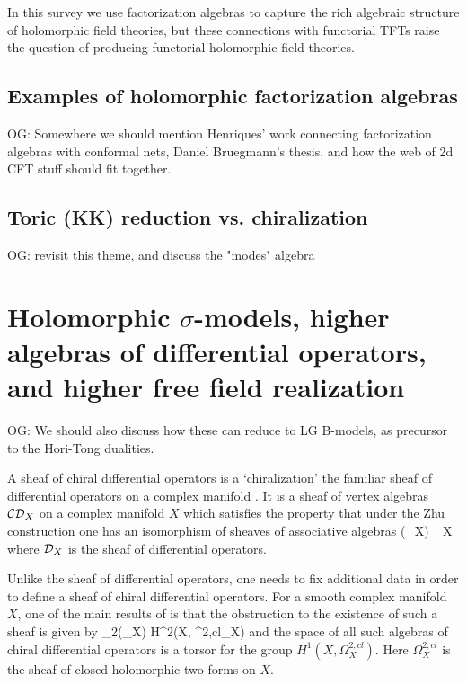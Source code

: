 \documentclass[11pt]{amsart}
\def\CDO{{\cC\cD}}
\def\owen#1{{\textcolor{violet!65!black}{OG: {#1}}}}
\begin{document}
In this survey we use factorization algebras to capture the rich algebraic structure of holomorphic field theories,
but these connections with functorial TFTs raise the question of producing functorial holomorphic field theories.

\subsection{Examples of holomorphic factorization algebras}

\owen{Somewhere we should mention Henriques' work connecting factorization algebras with conformal nets,
Daniel Bruegmann's thesis, and how the web of 2d CFT stuff should fit together.}


\subsection{Toric (KK) reduction vs. chiralization}

\owen{revisit this theme, and discuss the "modes" algebra}

\section{Holomorphic $\sigma$-models, higher algebras of differential operators, and higher free field realization}

\owen{We should also discuss how these can reduce to LG B-models, as precursor to the Hori-Tong dualities.}

A sheaf of chiral differential operators is a `chiralization' the familiar sheaf of differential operators on a complex manifold \cite{}.
It is a sheaf of vertex algebras $\CDO_X$ on a complex manifold $X$ which satisfies the property that under the Zhu construction one has an isomorphism of sheaves of associative algebras
\beqn
{}(\CDO_X) \simeq \cD_X
\eeqn
where $\mathcal D_X$ is the sheaf of differential operators. 

Unlike the sheaf of differential operators, one needs to fix additional data in order to define a sheaf of chiral differential operators. 
For a smooth complex manifold $X$, one of the main results of \cite{} is that the obstruction to the existence of such a sheaf is given by
\beqn
\ch_2(\T_X) \in H^{2}(X, \Omega^{2,cl}_X) 
\eeqn
and the space of all such algebras of chiral differential operators is a torsor for the group $H^{1}(X, \Omega^{2,cl}_X)$.
Here $\Omega^{2,cl}_X$ is the sheaf of closed holomorphic two-forms on $X$. 
\end{document}
